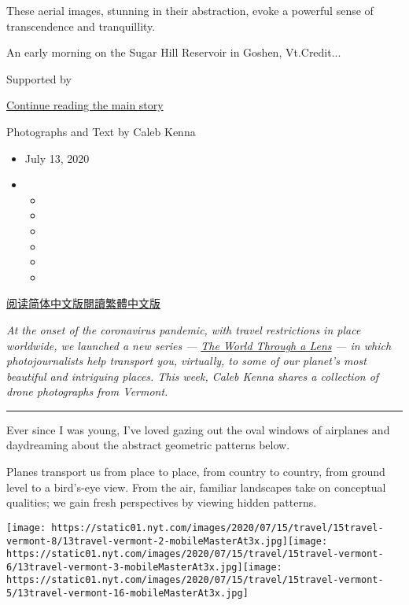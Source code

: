 These aerial images, stunning in their abstraction, evoke a powerful
sense of transcendence and tranquillity.

An early morning on the Sugar Hill Reservoir in Goshen, Vt.Credit...

Supported by

\protect\hyperlink{after-sponsor}{Continue reading the main story}

Photographs and Text by Caleb Kenna

\begin{itemize}
\item
  July 13, 2020
\item
  \begin{itemize}
  \item
  \item
  \item
  \item
  \item
  \item
  \end{itemize}
\end{itemize}

\href{https://cn.nytimes.com/travel/20200721/vermont-drone-photographs/}{阅读简体中文版}\href{https://cn.nytimes.com/travel/20200721/vermont-drone-photographs/zh-hant/}{閱讀繁體中文版}

\emph{At the onset of the coronavirus pandemic, with travel restrictions
in place worldwide, we launched a new series ---}
\href{https://www.nytimes.com/column/the-world-through-a-lens}{\emph{The
World Through a Lens}} \emph{--- in which photojournalists help
transport you, virtually, to some of our planet's most beautiful and
intriguing places. This week, Caleb Kenna shares a collection of drone
photographs from Vermont.}

\begin{center}\rule{0.5\linewidth}{\linethickness}\end{center}

Ever since I was young, I've loved gazing out the oval windows of
airplanes and daydreaming about the abstract geometric patterns below.

Planes transport us from place to place, from country to country, from
ground level to a bird's-eye view. From the air, familiar landscapes
take on conceptual qualities; we gain fresh perspectives by viewing
hidden patterns.

\texttt{[image: https://static01.nyt.com/images/2020/07/15/travel/15travel-vermont-8/13travel-vermont-2-mobileMasterAt3x.jpg]}\texttt{[image: https://static01.nyt.com/images/2020/07/15/travel/15travel-vermont-6/13travel-vermont-3-mobileMasterAt3x.jpg]}\texttt{[image: https://static01.nyt.com/images/2020/07/15/travel/15travel-vermont-5/13travel-vermont-16-mobileMasterAt3x.jpg]}

